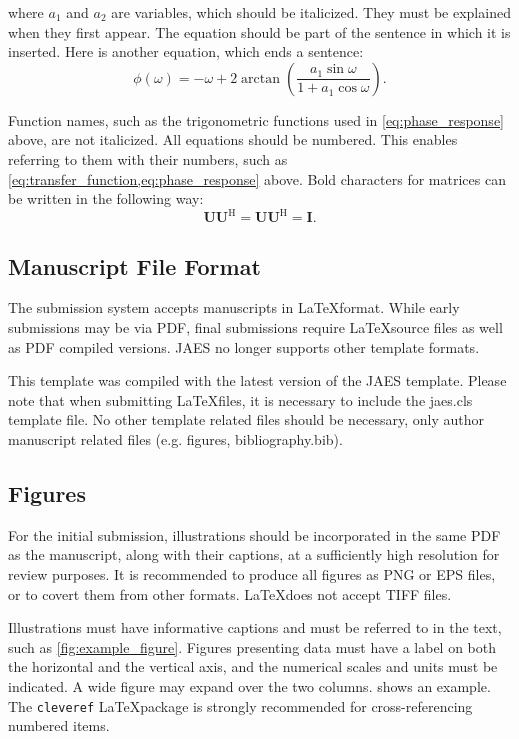 \documentclass[fleqn]{jaes}
\begin{document}
\noindent where $a_1$ and $a_2$ are variables, which should be italicized. They must be explained when they first appear. The equation should be part of the sentence in which it is inserted. Here is another equation, which ends a sentence: 
\begin{equation}
\phi (\omega ) =  - \omega  + 2 \arctan \left( {\frac{{a_1 \sin \omega }}{{1 + a_1 \cos \omega }}} \right).
\label{eq:phase_response}
\end{equation}
 
\noindent Function names, such as the trigonometric functions used in \cref{eq:phase_response} above, are not italicized. All equations should be numbered. This enables referring to them with their numbers, such as \cref{eq:transfer_function,eq:phase_response} above. Bold characters for matrices can be written in the following way:
\begin{equation}
\mathbf{U}\mathbf{U}^\mathrm{H} = \mathbf{U}\mathbf{U}^\mathrm{H} = \mathbf{I}.
\end{equation}

\subsection{Manuscript File Format}
The submission system accepts manuscripts in \LaTeX format. While early submissions may be via PDF, final submissions require \LaTeX source files as well as PDF compiled versions. JAES no longer supports other template formats. 

This template was compiled with the latest version of the JAES template. Please note that when submitting \LaTeX files, it is necessary to include the jaes.cls template file. No other template related files should be necessary, only author manuscript related files (e.g. figures, bibliography.bib). 

\subsection{Figures}

 For the initial submission, illustrations should be incorporated in the same PDF as the manuscript, along with their captions, at a sufficiently high resolution for review purposes. It is recommended to produce all figures as PNG or EPS files, or to covert them from other formats. \LaTeX does not accept TIFF files. 
 
 Illustrations must have informative captions and must be referred to in the text, such as \cref{fig:example_figure}. Figures presenting data must have a label on both the horizontal and the vertical axis, and the numerical scales and units must be indicated. A wide figure may expand over the two columns.  shows an example. The \texttt{cleveref} \LaTeX package is strongly recommended for cross-referencing numbered items. 
\end{document}
